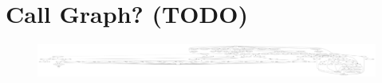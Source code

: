 \chapter{Call Graph? (TODO)}
\newpage
\begin{figure}[H]
    \centering
    \includegraphics*[viewport=0 0 2250 1500, angle=90, width=\linewidth]{Images/transfer_init.pdf}
    \caption{} 
\end{figure} 
{}
\listoffigures
{}
\listoftables